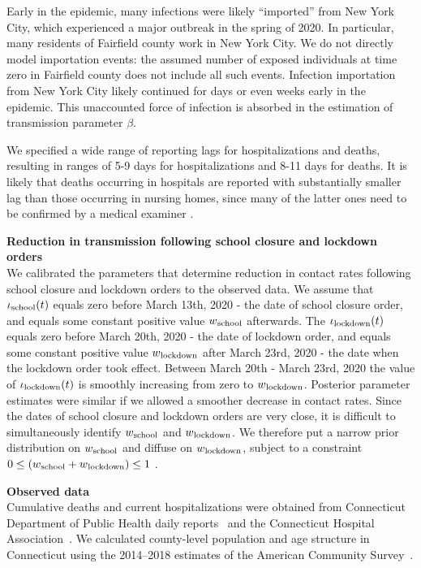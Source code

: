 \documentclass[11pt]{article}
\begin{document}
Early in the epidemic, many infections were likely ``imported'' from New York City, which experienced a major outbreak in the spring of 2020. In particular, many residents of Fairfield county work in New York City. We do not directly model importation events: the assumed number of exposed individuals at time zero in Fairfield county does not include all such events. Infection importation from New York City likely continued for days or even weeks early in the epidemic. This unaccounted force of infection is absorbed in the estimation of transmission parameter $\beta$.

We specified a wide range of reporting lags for hospitalizations and deaths, resulting in ranges of 5-9 days for hospitalizations and 8-11 days for deaths. It is likely that deaths occurring in hospitals are reported with substantially smaller lag than those occurring in nursing homes, since many of the latter ones need to be confirmed by a medical examiner \citep{DPHwebsitenursing}.  

\textbf{Reduction in transmission following school closure and lockdown orders} \\[0.5em]
We calibrated the parameters that determine reduction in contact rates following school closure and lockdown orders to the observed data. 
We assume that $\iota\textsubscript{school}(t)$ equals zero before March 13th, 2020 - the date of school closure order, and equals some constant positive value $w\textsubscript{school}$ afterwards. 
The  $\iota\textsubscript{lockdown} (t)$ equals zero before March 20th, 2020 - the date of lockdown order, and equals some constant positive value $w\textsubscript{lockdown}$ after March 23rd, 2020 - the date when the lockdown order took effect. Between March 20th - March 23rd, 2020 the value of $\iota\textsubscript{lockdown} (t)$ is smoothly increasing from zero to $w\textsubscript{lockdown}$. Posterior parameter estimates were similar if we allowed a smoother decrease in contact rates.
Since the dates of school closure and lockdown orders are very close, it is difficult to simultaneously identify $w\textsubscript{school}$ and $w\textsubscript{lockdown}$. We therefore put a narrow prior distribution on $w\textsubscript{school}$ and diffuse on $w\textsubscript{lockdown}$, subject to a constraint $ 0 \le (w\textsubscript{school} + w\textsubscript{lockdown}) \le 1$ . 


\textbf{Observed data} \\[0.5em]
Cumulative deaths and current hospitalizations were obtained from Connecticut Department of Public Health daily reports~\citep{DPHwebsite} and the Connecticut Hospital Association~\citep{CHAwebsite}. 
We calculated county-level population and age structure in Connecticut using the 2014--2018 estimates of the American Community Survey~\citep{acs2018}. 
\end{document}
